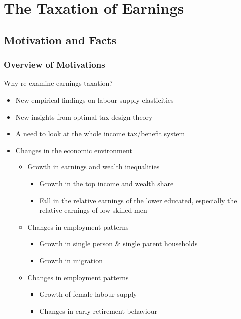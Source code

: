 \chapter{The Taxation of Earnings}



\section{Motivation and Facts}

    \subsection{Overview of Motivations}

        Why re-examine earnings taxation?
        \begin{itemize}
            \item New empirical findings on labour supply elasticities
            \item New insights from optimal tax design theory
            \item A need to look at the whole income tax/benefit system
            \item Changes in the economic environment
            \begin{itemize}
                \item Growth in earnings and wealth inequalities
                \begin{itemize}
                    \item Growth in the top income and wealth share
                    \item Fall in the relative earnings of the lower educated, especially the relative earnings of low skilled men
                \end{itemize}
                \item Changes in employment patterns
                \begin{itemize}
                    \item Growth in single person \& single parent households
                    \item Growth in migration
                \end{itemize}
                \item Changes in employment patterns
                \begin{itemize}
                    \item Growth of female labour supply
                    \item Changes in early retirement behaviour
                \end{itemize}
            \end{itemize}
        \end{itemize}


